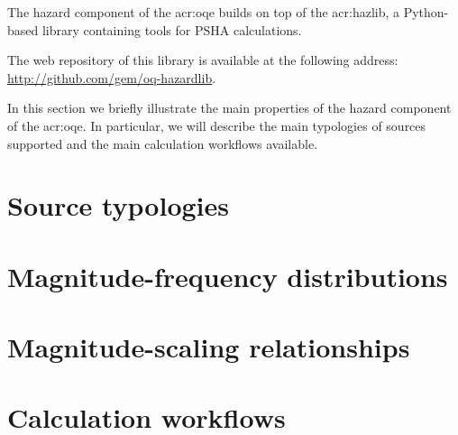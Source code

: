 
The hazard component of the \glsdesc{acr:oqe} builds on top of the
\gls{acr:hazlib}, a Python-based library containing tools for PSHA
calculations.

The web repository of this library is available at the following address:\\
\href{http://github.com/gem/oq-hazardlib}{http://github.com/gem/oq-hazardlib}.

In this section we briefly illustrate the main properties of the hazard
component of the \glsdesc{acr:oqe}. In particular, we will describe the main
typologies of sources supported and the main calculation workflows available.


\section{Source typologies}
\label{sec:source_typologies}


\section{Magnitude-frequency distributions}
\label{sec:mfd_list}


\section{Magnitude-scaling relationships}
\label{sec:msr_list}


\section{Calculation workflows}
\label{sec:hazard_calculators}
